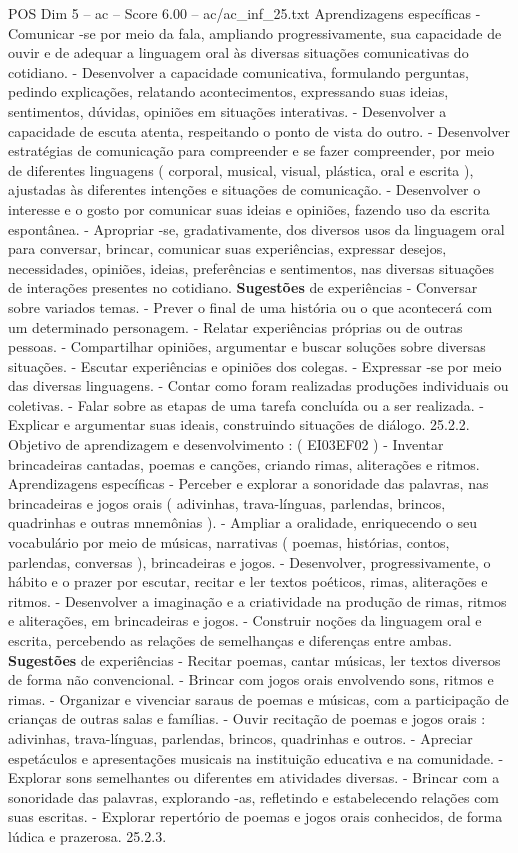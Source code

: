\begin{textsample}{POS Dim 5 – ac – Score 6.00 – ac/ac\_inf\_25.txt}
Aprendizagens específicas - Comunicar -se por meio da fala, ampliando progressivamente, sua capacidade de ouvir e de adequar a linguagem oral às diversas situações comunicativas do cotidiano. - Desenvolver a capacidade comunicativa, formulando perguntas, pedindo explicações, relatando acontecimentos, expressando suas ideias, sentimentos, dúvidas, opiniões em situações interativas. - Desenvolver a capacidade de escuta atenta, respeitando o ponto de vista do outro. - Desenvolver estratégias de comunicação para compreender e se fazer compreender, por meio de diferentes linguagens ( corporal, musical, visual, plástica, oral e escrita ), ajustadas às diferentes intenções e situações de comunicação. - Desenvolver o interesse e o gosto por comunicar suas ideias e opiniões, fazendo uso da escrita espontânea. - Apropriar -se, gradativamente, dos diversos usos da linguagem oral para conversar, brincar, comunicar suas experiências, expressar desejos, necessidades, opiniões, ideias, preferências e sentimentos, nas diversas situações de interações presentes no cotidiano. \textbf{Sugestões} de experiências - Conversar sobre variados temas. - Prever o final de uma história ou o que acontecerá com um determinado personagem. - Relatar experiências próprias ou de outras pessoas. - Compartilhar opiniões, argumentar e buscar soluções sobre diversas situações. - Escutar experiências e opiniões dos colegas. - Expressar -se por meio das diversas linguagens. - Contar como foram realizadas produções individuais ou coletivas. - Falar sobre as etapas de uma tarefa concluída ou a ser realizada. - Explicar e argumentar suas ideais, construindo situações de diálogo. 25.2.2.
Objetivo de aprendizagem e desenvolvimento : ( EI03EF02 ) - Inventar brincadeiras cantadas, poemas e canções, criando rimas, aliterações e ritmos.
Aprendizagens específicas - Perceber e explorar a sonoridade das palavras, nas brincadeiras e jogos orais ( adivinhas, trava-línguas, parlendas, brincos, quadrinhas e outras mnemônias ). - Ampliar a oralidade, enriquecendo o seu vocabulário por meio de músicas, narrativas ( poemas, histórias, contos, parlendas, conversas ), brincadeiras e jogos. - Desenvolver, progressivamente, o hábito e o prazer por escutar, recitar e ler textos poéticos, rimas, aliterações e ritmos. - Desenvolver a imaginação e a criatividade na produção de rimas, ritmos e aliterações, em brincadeiras e jogos. - Construir noções da linguagem oral e escrita, percebendo as relações de semelhanças e diferenças entre ambas. \textbf{Sugestões} de experiências - Recitar poemas, cantar músicas, ler textos diversos de forma não convencional. - Brincar com jogos orais envolvendo sons, ritmos e rimas. - Organizar e vivenciar saraus de poemas e músicas, com a participação de crianças de outras salas e famílias. - Ouvir recitação de poemas e jogos orais : adivinhas, trava-línguas, parlendas, brincos, quadrinhas e outros. - Apreciar espetáculos e apresentações musicais na instituição educativa e na comunidade. - Explorar sons semelhantes ou diferentes em atividades diversas. - Brincar com a sonoridade das palavras, explorando -as, refletindo e estabelecendo relações com suas escritas. - Explorar repertório de poemas e jogos orais conhecidos, de forma lúdica e prazerosa. 25.2.3.

\end{textsample}

